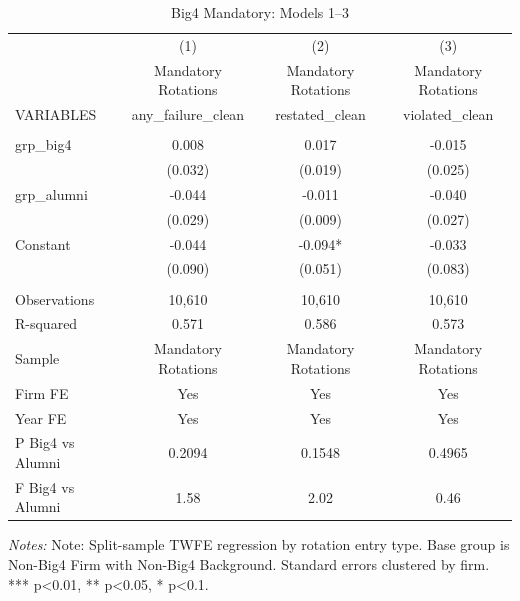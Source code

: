 \begin{table}[htbp]
\footnotesize
\centering
\caption{Big4 Mandatory: Models 1--3}
\begin{threeparttable}
\begin{tabular}{p{}ccc}
\toprule
 & (1) & (2) & (3) \\
 & Mandatory Rotations & Mandatory Rotations & Mandatory Rotations \\
VARIABLES & any\_failure\_clean & restated\_clean & violated\_clean \\
\midrule
 &  &  &  \\
grp\_big4 & 0.008 & 0.017 & -0.015 \\
 & (0.032) & (0.019) & (0.025) \\
grp\_alumni & -0.044 & -0.011 & -0.040 \\
 & (0.029) & (0.009) & (0.027) \\
Constant & -0.044 & -0.094* & -0.033 \\
 & (0.090) & (0.051) & (0.083) \\
 &  &  &  \\
Observations & 10,610 & 10,610 & 10,610 \\
R-squared & 0.571 & 0.586 & 0.573 \\
Sample & Mandatory Rotations & Mandatory Rotations & Mandatory Rotations \\
Firm FE & Yes & Yes & Yes \\
Year FE & Yes & Yes & Yes \\
P Big4 vs Alumni & 0.2094 & 0.1548 & 0.4965 \\
F Big4 vs Alumni & 1.58 & 2.02 & 0.46 \\
\bottomrule
\end{tabular}
\begin{tablenotes}\footnotesize
\item \raggedright \textit{Notes:} Note: Split-sample TWFE regression by rotation entry type. Base group is Non-Big4 Firm with Non-Big4 Background. Standard errors clustered by firm. *** p<0.01, ** p<0.05, * p<0.1.
\end{tablenotes}
\end{threeparttable}
\end{table}
